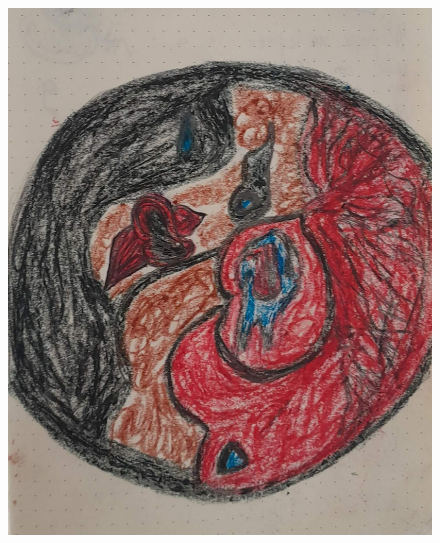 \documentclass[12pt, a4paper, twoside]{book} %
\begin{document}
\begin{figure}[H]
	\centering
	\includegraphics[width=\textwidth]{./images/1f81324dd84b67.jpg}
\end{figure}

\clearpage
\end{document}
